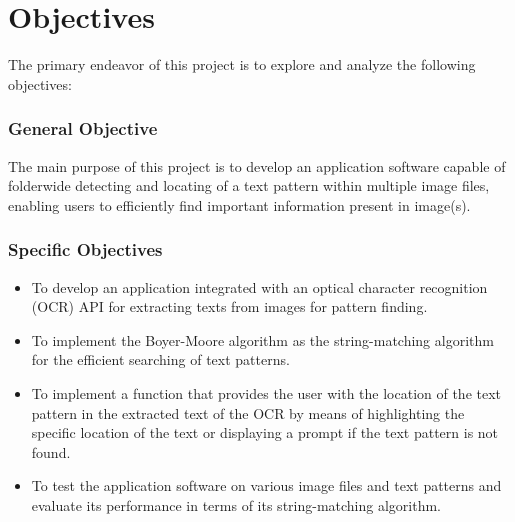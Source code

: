 \part{Objectives}

The primary endeavor of this project is to explore and analyze the following objectives:

\section*{General Objective}
\hspace\parindent
The main purpose of this project is to develop an application software capable of folderwide
detecting and locating of a text pattern within multiple image files, enabling users to efficiently
find important information present in image(s).

\section*{Specific Objectives}
\begin{itemize}
    \item To develop an application integrated with an optical character recognition (OCR) API for
        extracting texts from images for pattern finding.
    \item To implement the Boyer-Moore algorithm as the string-matching algorithm for the efficient
        searching of text patterns.
    \item To implement a function that provides the user with the location of the text pattern in
        the extracted text of the OCR by means of highlighting the specific location of the text or
        displaying a prompt if the text pattern is not found.
    \item To test the application software on various image files and text patterns and evaluate its
        performance in terms of its string-matching algorithm.
\end{itemize}
